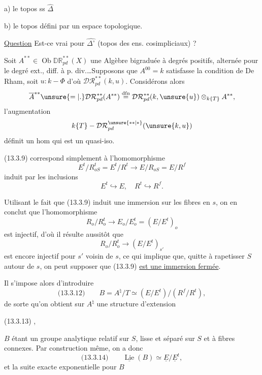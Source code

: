 a) le topos ss $\widehat\Delta$

b) le topos défini par un espace topologique. 

\uline{Question} Est-ce vrai pour $\widehat{\Delta^\circ}$ (topos des ens. cosimpliciaux) ? 

Soit $A^{**}\in\operatorname{Ob}\mathbb{DR}_{pd}^{**}(X)$ une Algèbre bigraduée à degrés positifs, alternée pour le degré ext., diff. à p. div.\ldots Supposons que $A^{00}=k$ satisfasse la condition de De Rham, soit $u:k\mathbin{-}\Phi$ d'où $\mathcal{DR}_{pd}^{**}(k,u)$. Considérons alors
\[
\overline A^{**}\unsure{=|.}\mathcal{DR}_{pd}^{**}(A^{**})
\overset{\mathrm{dfn}}=
\mathcal{DR}_{pd}^{**}(k,\unsure{u})\otimes_{k\{T\}}A^{**},
\]
l'augmentation
\[
k\{T\}\mathbin{-}\mathcal{DR}_{pd}^{\unsure{**|*}}(\unsure{k,u})
\]
définit un hom
qui est un quasi-iso.



(13.3.9) correspond simplement à l'homomorphisme
\[
E^t/R_{oS}^t=E^t/R^t\longrightarrow E/R_{oS}=E/R^f
\]
induit par les inclusions
\[
E^t\hookrightarrow E,\quad R^t\hookrightarrow R^f.
\]

Utilisant le fait que (13.3.9) induit une immersion sur les fibres en $s$, on en conclut que l'homomorphisme
\[
R_o/R_o^t\longrightarrow E_o/E_o^t=(E/E^t)_o
\]
est injectif, d'où il résulte aussitôt que
\[
R_o/R_o^t\longrightarrow(E/E^t)_{s'}
\]
est encore injectif pour $s'$ voisin de $s$, ce qui implique que, quitte à rapetisser $S$ autour de $s$, on peut supposer que (13.3.9) \uline{est une immersion fermée}.

Il s'impose alors d'introduire
\[
\text{(13.3.12)}\qquad B=A^\natural/T\simeq(E/E^t)/(R^f/R^t),
\]
de sorte qu'on obtient sur $A^\natural$ une structure d'extension

(13.3.13)
,

$B$ étant un groupe analytique relatif sur $S$, lisse et séparé sur $S$ et à fibres connexes. Par construction même, on a donc
\[
\text{(13.3.14)}\qquad \underline{\operatorname{Lie}}(B)\simeq\underline E/\underline E^t,
\]
et la suite exacte exponentielle pour $B$

